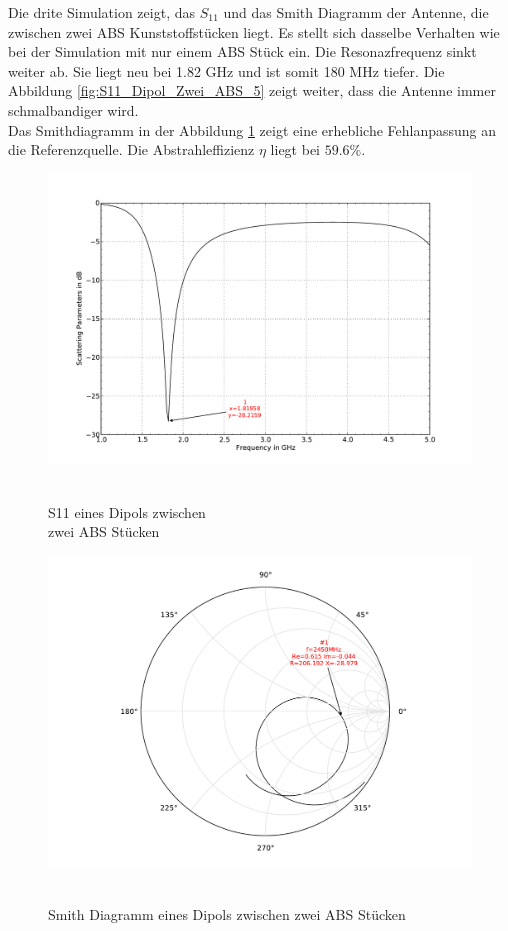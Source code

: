 \newpage
Die drite Simulation zeigt, das $S_{11}$ und das Smith Diagramm der Antenne, die zwischen zwei ABS Kunststoffstücken liegt. Es stellt sich dasselbe Verhalten wie bei der Simulation mit nur einem ABS Stück ein. Die Resonazfrequenz sinkt weiter ab. Sie liegt neu bei 1.82 GHz und ist somit 180 MHz tiefer. Die Abbildung  \ref{fig:S11_Dipol_Zwei_ABS_5} zeigt weiter, dass die Antenne immer schmalbandiger wird.\\
Das Smithdiagramm in der Abbildung \ref{fig:Smith_Dipol_Zwei_ABS_6} zeigt eine erhebliche Fehlanpassung an die Referenzquelle. Die Abstrahleffizienz $\eta$ liegt  bei $59.6 \%$.

\begin{figure}[!htb]
\begin{center}
  \includegraphics[width=\linewidth]{content/bilder/Evaluation/Dipol/S11DipolZweiABS.pdf}
  \caption{\\S11 eines Dipols zwischen \\zwei ABS Stücken}\label{fig:S11_Dipol_Zwei_ABS_5}
\endminipage%
{}
  \includegraphics[width=\linewidth]{content/bilder/Evaluation/Dipol/SmithDipolZweiABS.pdf}
  \caption{\\Smith Diagramm eines Dipols zwischen zwei ABS Stücken}\label{fig:Smith_Dipol_Zwei_ABS_6}
\endminipage
\end{center}
\end{figure}

